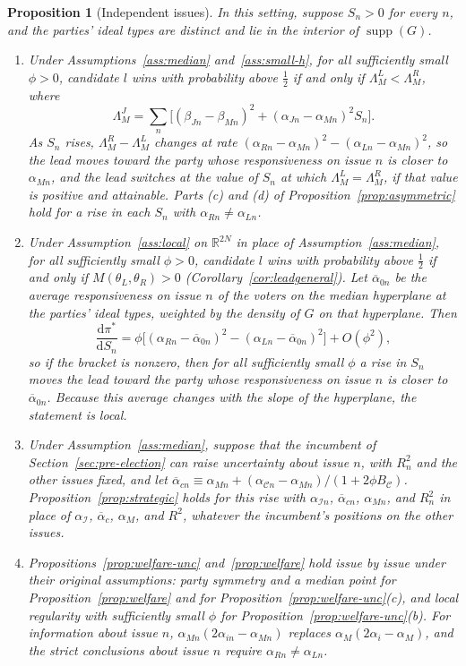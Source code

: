 \documentclass[12pt,letterpaper]{article}
\newtheorem{proposition}{Proposition}
\begin{document}
\begin{proposition}[Independent issues]\label{prop:issues}
In this setting, suppose $S_n>0$ for every $n$, and the parties' ideal types are distinct and lie in the interior of $\operatorname{supp}(G)$.
\begin{enumerate}
  \item[(a)] Under Assumptions~\ref{ass:median} and~\ref{ass:small-h}, for all sufficiently small $\phi>0$, candidate $l$ wins with probability above $\tfrac12$ if and only if $\Lambda_M^L<\Lambda_M^R$, where
  \[
  \Lambda_M^J=\sum_n\Big[(\beta_{Jn}-\beta_{Mn})^2+(\alpha_{Jn}-\alpha_{Mn})^2S_n\Big].
  \]
   As $S_n$ rises, $\Lambda_M^R-\Lambda_M^L$ changes at rate $(\alpha_{Rn}-\alpha_{Mn})^2-(\alpha_{Ln}-\alpha_{Mn})^2$, so the lead moves toward the party whose responsiveness on issue $n$ is closer to $\alpha_{Mn}$, and the lead switches at the value of $S_n$ at which $\Lambda_M^L=\Lambda_M^R$, if that value is positive and attainable. Parts (c) and (d) of Proposition~\ref{prop:asymmetric} hold for a rise in each $S_n$ with $\alpha_{Rn}\ne\alpha_{Ln}$.
  \item[(b)] Under Assumption~\ref{ass:local} on $\mathbb{R}^{2N}$ in place of Assumption~\ref{ass:median}, for all sufficiently small $\phi>0$, candidate $l$ wins with probability above $\tfrac12$ if and only if $M(\theta_L,\theta_R)>0$ (Corollary~\ref{cor:leadgeneral}). Let $\overline{\alpha}_{0n}$ be the average responsiveness on issue $n$ of the voters on the median hyperplane at the parties' ideal types, weighted by the density of $G$ on that hyperplane. Then
  \[
  \frac{\mathrm{d}\pi^*}{\mathrm{d}S_n}=\phi\Big[(\alpha_{Rn}-\overline{\alpha}_{0n})^2-(\alpha_{Ln}-\overline{\alpha}_{0n})^2\Big]+O(\phi^2),
  \]
  so if the bracket is nonzero, then for all sufficiently small $\phi$ a rise in $S_n$ moves the lead toward the party whose responsiveness on issue $n$ is closer to $\overline{\alpha}_{0n}$. Because this average changes with the slope of the hyperplane, the statement is local.
  \item[(c)] Under Assumption~\ref{ass:median}, suppose that the incumbent of Section~\ref{sec:pre-election} can raise uncertainty about issue $n$, with $R_n^2$ and the other issues fixed, and let $\overline{\alpha}_{cn}\equiv\alpha_{Mn}+(\alpha_{\mathcal{C}n}-\alpha_{Mn})/(1+2\phi B_{\mathcal C})$. Proposition~\ref{prop:strategic} holds for this rise with $\alpha_{\mathcal{I}n}$, $\overline{\alpha}_{cn}$, $\alpha_{Mn}$, and $R_n^2$ in place of $\alpha_{\mathcal I}$, $\overline{\alpha}_c$, $\alpha_M$, and $R^2$, whatever the incumbent's positions on the other issues.
  \item[(d)] Propositions~\ref{prop:welfare-unc} and~\ref{prop:welfare} hold issue by issue under their original assumptions: party symmetry and a median point for Proposition~\ref{prop:welfare} and for Proposition~\ref{prop:welfare-unc}(c), and local regularity with sufficiently small $\phi$ for Proposition~\ref{prop:welfare-unc}(b). For information about issue $n$, $\alpha_{Mn}(2\alpha_{in}-\alpha_{Mn})$ replaces $\alpha_M(2\alpha_i-\alpha_M)$, and the strict conclusions about issue $n$ require $\alpha_{Rn}\ne\alpha_{Ln}$.
\end{enumerate}
\end{proposition}
\end{document}
